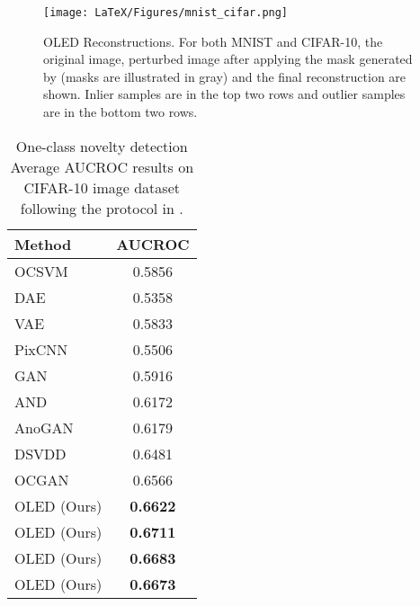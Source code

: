 \documentclass[10pt,twocolumn,letterpaper]{article}
\begin{document}
\begin{figure}[t]
\begin{center}
\texttt{[image: LaTeX/Figures/mnist\_cifar.png]}
\end{center}
   \caption{OLED Reconstructions. For both MNIST and CIFAR-10, the original image, perturbed image after applying the mask generated by  (masks are illustrated in gray) and the final reconstruction are shown. Inlier samples are in the top two rows and outlier samples are in the bottom two rows.}
\label{CIFAR-10_mnist}
\end{figure}


\begin{table}
\begin{center}
 \begin{tabular}{|l|c|} 
 \hline
Method & AUCROC \\ [0.5ex] 
 \hline\hline
 OCSVM \cite{scholkopf2002learning} & 0.5856  \\ 

 DAE \cite{vincent2010stacked} & 0.5358  \\

 VAE \cite{kingma2013auto} & 0.5833  \\
 
 PixCNN \cite{oord2016conditional} & 0.5506  \\

 GAN \cite{schlegl2017unsupervised} & 0.5916 \\ 
 
 AND \cite{abati2019latent} & 0.6172  \\ 

 AnoGAN \cite{schlegl2017unsupervised} & 0.6179 \\

 DSVDD \cite{ruff2018deep} & 0.6481  \\

 OCGAN \cite{perera2019ocgan} & 0.6566  \\

 \hline
 OLED (Ours)   & \textbf{0.6622} \\ 
 OLED (Ours)   & \textbf{0.6711} \\
 OLED (Ours)   & \textbf{0.6683} \\
 OLED (Ours)   & \textbf{0.6673} \\

 \hline
\end{tabular}
\end{center}
\caption{One-class novelty detection Average AUCROC results on CIFAR-10 image dataset following the protocol in \cite{perera2019ocgan}.}
\label{CIFAR-10_exp}
\end{table}
\end{document}
